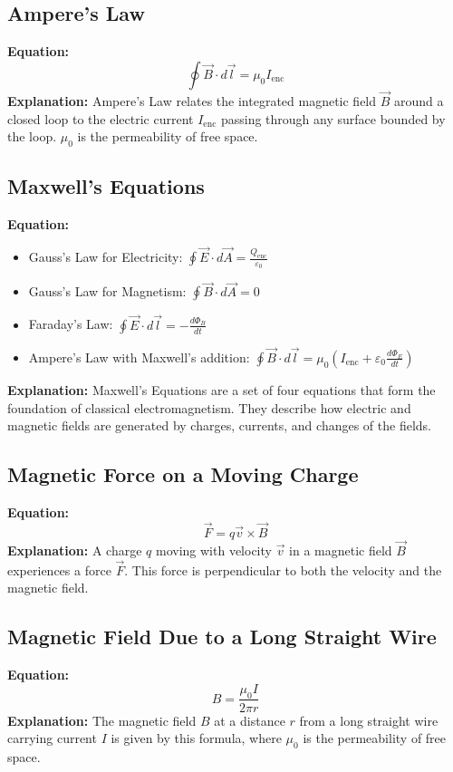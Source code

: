 \documentclass{article}
\begin{document}
\subsection*{Ampere's Law}
\textbf{Equation:} 
\[ \oint \vec{B} \cdot d\vec{l} = \mu_0 I_{\text{enc}} \]
\textbf{Explanation:} 
Ampere's Law relates the integrated magnetic field \( \vec{B} \) around a closed loop to the electric current \( I_{\text{enc}} \) passing through any surface bounded by the loop. \( \mu_0 \) is the permeability of free space.

\subsection*{Maxwell's Equations}
\textbf{Equation:} 
\begin{itemize}
    \item Gauss's Law for Electricity: \( \oint \vec{E} \cdot d\vec{A} = \frac{Q_{\text{enc}}}{\varepsilon_0} \)
    \item Gauss's Law for Magnetism: \( \oint \vec{B} \cdot d\vec{A} = 0 \)
    \item Faraday's Law: \( \oint \vec{E} \cdot d\vec{l} = -\frac{d\Phi_B}{dt} \)
    \item Ampere's Law with Maxwell's addition: \( \oint \vec{B} \cdot d\vec{l} = \mu_0 (I_{\text{enc}} + \varepsilon_0 \frac{d\Phi_E}{dt}) \)
\end{itemize}
\textbf{Explanation:} 
Maxwell's Equations are a set of four equations that form the foundation of classical electromagnetism. They describe how electric and magnetic fields are generated by charges, currents, and changes of the fields.

\subsection*{Magnetic Force on a Moving Charge}
\textbf{Equation:} 
\[ \vec{F} = q\vec{v} \times \vec{B} \]
\textbf{Explanation:} 
A charge \( q \) moving with velocity \( \vec{v} \) in a magnetic field \( \vec{B} \) experiences a force \( \vec{F} \). This force is perpendicular to both the velocity and the magnetic field.

\subsection*{Magnetic Field Due to a Long Straight Wire}
\textbf{Equation:} 
\[ B = \frac{\mu_0 I}{2\pi r} \]
\textbf{Explanation:} 
The magnetic field \( B \) at a distance \( r \) from a long straight wire carrying current \( I \) is given by this formula, where \( \mu_0 \) is the permeability of free space.
\end{document}
